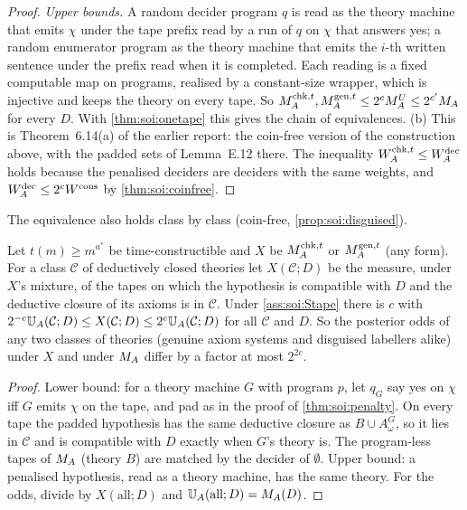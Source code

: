 \begin{proof}
\emph{Upper bounds.} A random decider program $q$ is read as the theory machine that emits $\chi$ under the tape prefix read by a run of $q$ on $\chi$ that answers yes; a random enumerator program as the theory machine that emits the $i$-th written sentence under the prefix read when it is completed. Each reading is a fixed computable map on programs, realised by a constant-size wrapper, which is injective and keeps the theory on every tape. So $M_{A}^{\mathrm{chk},t},M_{A}^{\mathrm{gen},t}\le2^cM_A^U\le2^{c'}M_{A}$ for every $D$. With \cref{thm:soi:onetape} this gives the chain of equivalences.
(b) This is Theorem~6.14(a) of the earlier report: the coin-free version of the construction above, with the padded sets of Lemma~E.12 there. The inequality $W_{A}^{\mathrm{chk},t}\le W_{A}^{\mathrm{dec}}$ holds because the penalised deciders are deciders with the same weights, and $W_{A}^{\mathrm{dec}}\le2^cW^{\mathrm{cons}}$ by \cref{thm:soi:coinfree}.
\end{proof}

The equivalence also holds class by class (coin-free, \cref{prop:soi:disguised}).

\begin{proposition}\label{prop:soi:classes}
Let $t(m)\ge m^{a^*}$ be time-constructible and $X$ be $M_{A}^{\mathrm{chk},t}$ or $M_{A}^{\mathrm{gen},t}$ (any form). For a class $\mathcal C$ of deductively closed theories let $X(\mathcal C;D)$ be the measure, under $X$'s mixture, of the tapes on which the hypothesis is compatible with $D$ and the deductive closure of its axioms is in $\mathcal C$. Under \cref{ass:soi:Stape} there is $c$ with $2^{-c}\mathbb{U}_{A}(\mathcal C;D)\le X(\mathcal C;D)\le2^c\mathbb{U}_{A}(\mathcal C;D)$ for all $\mathcal C$ and $D$. So the posterior odds of any two classes of theories (genuine axiom systems and disguised labellers alike) under $X$ and under $M_{A}$ differ by a factor at most $2^{2c}$.
\end{proposition}

\begin{proof}
Lower bound: for a theory machine $G$ with program $p$, let $q_G$ say yes on $\chi$ iff $G$ emits $\chi$ on the tape, and pad as in the proof of \cref{thm:soi:penalty}. On every tape the padded hypothesis has the same deductive closure as $B\cup A^G_\omega$, so it lies in $\mathcal C$ and is compatible with $D$ exactly when $G$'s theory is. The program-less tapes of $M_{A}$ (theory $B$) are matched by the decider of $\emptyset$. Upper bound: a penalised hypothesis, read as a theory machine, has the same theory. For the odds, divide by $X(\text{all};D)$ and $\mathbb{U}_{A}(\text{all};D)=M_{A}(D)$.
\end{proof}


